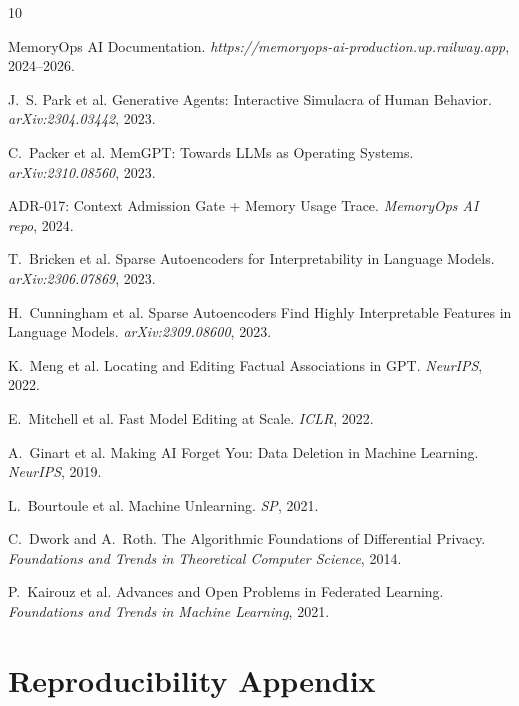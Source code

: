 \documentclass[11pt]{article}
\begin{document}

\begin{thebibliography}{10}

MemoryOps AI Documentation.
\textit{https://memoryops-ai-production.up.railway.app}, 2024--2026.

J.~S. Park et al.
Generative Agents: Interactive Simulacra of Human Behavior.
\textit{arXiv:2304.03442}, 2023.

C.~Packer et al.
MemGPT: Towards LLMs as Operating Systems.
\textit{arXiv:2310.08560}, 2023.

ADR-017: Context Admission Gate + Memory Usage Trace.
\textit{MemoryOps AI repo}, 2024.

T.~Bricken et al.
Sparse Autoencoders for Interpretability in Language Models.
\textit{arXiv:2306.07869}, 2023.

H.~Cunningham et al.
Sparse Autoencoders Find Highly Interpretable Features in Language Models.
\textit{arXiv:2309.08600}, 2023.

K.~Meng et al.
Locating and Editing Factual Associations in GPT.
\textit{NeurIPS}, 2022.

E.~Mitchell et al.
Fast Model Editing at Scale.
\textit{ICLR}, 2022.

A.~Ginart et al.
Making AI Forget You: Data Deletion in Machine Learning.
\textit{NeurIPS}, 2019.

L.~Bourtoule et al.
Machine Unlearning.
\textit{SP}, 2021.

C.~Dwork and A.~Roth.
The Algorithmic Foundations of Differential Privacy.
\textit{Foundations and Trends in Theoretical Computer Science}, 2014.

P.~Kairouz et al.
Advances and Open Problems in Federated Learning.
\textit{Foundations and Trends in Machine Learning}, 2021.

\end{thebibliography}

\appendix

\section{Reproducibility Appendix}
\label{app:repro}
\end{document}
